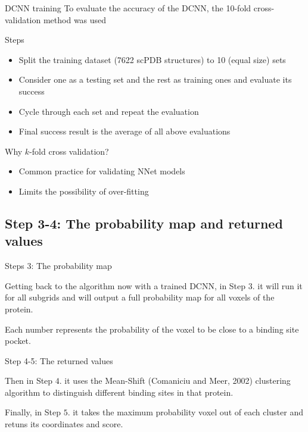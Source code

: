 \documentclass{beamer}
\begin{document}
\begin{frame}{DCNN training}
  To evaluate the accuracy of the DCNN, the 10-fold cross-validation method was used
  \begin{block}{Steps}
    \begin{itemize}
      \item Split the training dataset (7622 scPDB structures) to 10 (equal size) sets
      \item Consider one as a testing set and the rest as training ones and evaluate its success
      \item Cycle through each set and repeat the evaluation
      \item Final success result is the average of all above evaluations
    \end{itemize}
  \end{block}
  \begin{block}{Why $k$-fold cross validation?}
    \begin{itemize}
      \item Common practice for validating NNet models
      \item Limits the possibility of over-fitting
    \end{itemize}
  \end{block}
\end{frame}

\subsection{Step 3-4: The probability map and returned values}

\begin{frame}{Steps 3: The probability map}
  \begin{block}{}
    Getting back to the algorithm now with a trained DCNN, in Step $3.$ it will run it for all subgrids and will output a full probability map for all voxels of the protein.
  
    Each number represents the probability of the voxel to be close to a binding site pocket.
  \end{block}
\end{frame}

\begin{frame}{Step 4-5: The returned values}
  \begin{block}{}
    Then in Step $4.$ it uses the Mean-Shift (Comaniciu and Meer, 2002) clustering algorithm to distinguish different binding sites in that protein.
  
    Finally, in Step $5.$ it takes the maximum probability voxel out of each cluster and retuns its coordinates and score.
  \end{block}
\end{frame}
\end{document}

